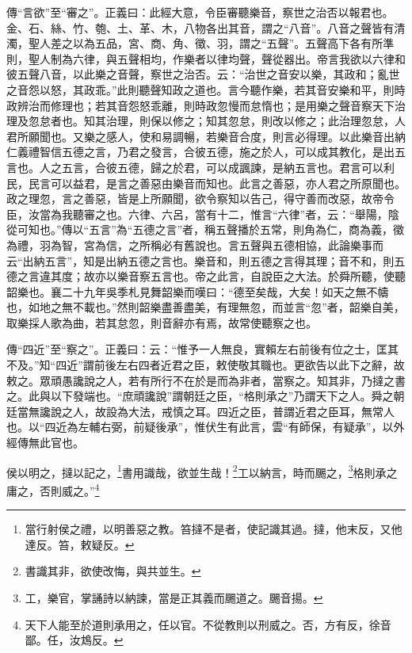 {\noindent\zhuan{}\fzbyks 傳“言欲”至“審之”。正義曰：此經大意，令臣審聽樂音，察世之治否以報君也。金、石、絲、竹、匏、土、革、木，八物各出其音，謂之“八音”。八音之聲皆有清濁，聖人差之以為五品，宮、商、角、徵、羽，謂之“五聲”。五聲高下各有所準則，聖人制為六律，與五聲相均，作樂者以律均聲，聲從器出。帝言我欲以六律和彼五聲八音，以此樂之音聲，察世之治否。云：“治世之音安以樂，其政和；亂世之音怨以怒，其政乖。”此則聽聲知政之道也。言今聽作樂，若其音安樂和平，則時政辨治而修理也；若其音怨怒乖離，則時政忽慢而怠惰也；是用樂之聲音察天下治理及忽怠者也。知其治理，則保以修之；知其忽怠，則改以修之；此治理忽怠，人君所願聞也。又樂之感人，使和易調暢，若樂音合度，則言必得理。以此樂音出納仁義禮智信五德之言，乃君之發言，合彼五德，施之於人，可以成其教化，是出五言也。人之五言，合彼五德，歸之於君，可以成諷諫，是納五言也。君言可以利民，民言可以益君，是言之善惡由樂音而知也。此言之善惡，亦人君之所原聞也。政之理忽，言之善惡，皆是上所願聞，欲令察知以告己，得守善而改惡，故帝令臣，汝當為我聽審之也。六律、六呂，當有十二，惟言“六律”者，云：“舉陽，陰從可知也。”傳以“五言”為“五德之言”者，稱五聲播於五常，則角為仁，商為義，徵為禮，羽為智，宮為信，之所稱必有舊說也。言五聲與五德相協，此論樂事而云“出納五言”，知是出納五德之言也。樂音和，則五德之言得其理；音不和，則五德之言違其度；故亦以樂音察五言也。帝之此言，自說臣之大法。於舜所聽，使聽韶樂也。襄二十九年吳季札見舞韶樂而嘆曰：“德至矣哉，大矣！如天之無不幬也，如地之無不載也。”然則韶樂盡善盡美，有理無忽，而並言“忽”者，韶樂自美，取樂採人歌為曲，若其怠忽，則音辭亦有焉，故常使聽察之也。 \par}

{\noindent\zhuan{}\fzbyks 傳“四近”至“察之”。正義曰：云：“惟予一人無良，實賴左右前後有位之士，匡其不及。”知“四近”謂前後左右四者近君之臣，敕使敬其職也。更欲告以此下之辭，故敕之。眾頑愚讒說之人，若有所行不在於是而為非者，當察之。知其非，乃撻之書之。此與以下發端也。“庶頑讒說”謂朝廷之臣，“格則承之”乃謂天下之人。舜之朝廷當無讒說之人，故設為大法，戒慎之耳。四近之臣，普謂近君之臣耳，無常人也。以“四近為左輔右弼，前疑後承”，惟伏生有此言，雲“有師保，有疑承”，以外經傳無此官也。 \par}

侯以明之，撻以記之，\footnote{當行射侯之禮，以明善惡之教。笞撻不是者，使記識其過。撻，他末反，又他達反。笞，敕疑反。}書用識哉，欲並生哉！\footnote{書識其非，欲使改悔，與共並生。}工以納言，時而颺之，\footnote{工，樂官，掌誦詩以納諫，當是正其義而颺道之。颺音揚。}格則承之庸之，否則威之。”\footnote{天下人能至於道則承用之，任以官。不從教則以刑威之。否，方有反，徐音鄙。任，汝鴆反。}

